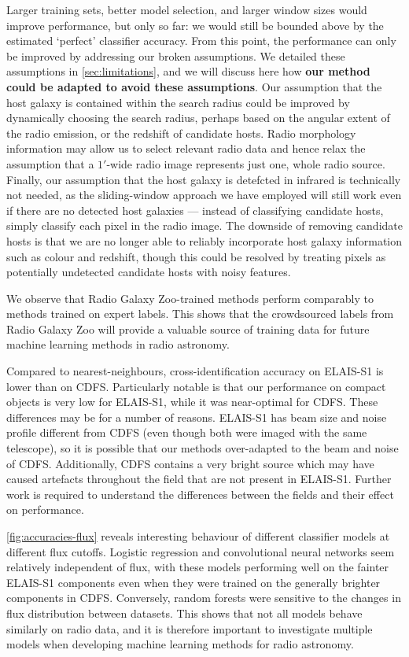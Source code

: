 \documentclass[fleqn,usenatbib,usedcolumn]{mnras}
\newcommand{\edited}[1]{{\bf {#1}}}
\begin{document}
  Larger training sets, better model selection, and larger window sizes would
  improve performance, but only so far: we would still be bounded above by the
  estimated `perfect' classifier accuracy. From this point, the performance
  can only be improved by addressing our broken assumptions. We detailed
  these assumptions in \autoref{sec:limitations}, and we will discuss here how
  \edited{our method could be adapted to avoid these assumptions}. Our assumption that the host galaxy is contained
  within the search radius could be improved by dynamically choosing the
  search radius, perhaps based on the angular extent of the radio emission, or the
  redshift of candidate hosts. Radio morphology information may allow us to
  select relevant radio data and hence relax the assumption that a $1'$-wide
  radio image represents just one, whole radio source. Finally, our assumption
  that the host galaxy is detefcted in infrared is technically not needed, as
  the sliding-window approach we have employed will still work even if there
  are no detected host galaxies --- instead of classifying candidate hosts,
  simply classify each pixel in the radio image. The downside of removing
  candidate hosts is that we are no longer able to reliably incorporate host
  galaxy information such as colour and redshift, though this could be
  resolved by treating pixels as potentially undetected candidate hosts with
  noisy features.

  We observe that Radio Galaxy Zoo-trained methods perform comparably to
  methods trained on expert labels. This shows that the crowdsourced labels
  from Radio Galaxy Zoo will provide a valuable source of training
  data for future machine learning methods in radio astronomy.

  Compared to nearest-neighbours, cross-identification accuracy on ELAIS-S1 is
  lower than on CDFS. Particularly notable is that our performance on compact
  objects is very low for ELAIS-S1, while it was near-optimal for CDFS. These
  differences may be for a number of reasons. ELAIS-S1 has beam size and noise
  profile different from CDFS (even though both were imaged with the same
  telescope), so it is possible that our methods over-adapted to the beam and
  noise of CDFS. Additionally, CDFS contains a very bright source which may
  have caused artefacts throughout the field that are not present in ELAIS-S1.
  Further work is required to understand the differences between the fields
  and their effect on performance.

  \autoref{fig:accuracies-flux} reveals interesting behaviour of different
  classifier models at different flux cutoffs. Logistic regression and
  convolutional neural networks seem relatively independent of flux, with
  these models performing well on the fainter ELAIS-S1 components even when
  they were trained on the generally brighter components in CDFS. Conversely,
  random forests were sensitive to the changes in flux distribution between
  datasets. This shows that not all models behave similarly on radio data,
  and it is therefore important to investigate multiple models when
  developing machine learning methods for radio astronomy.
\end{document}
